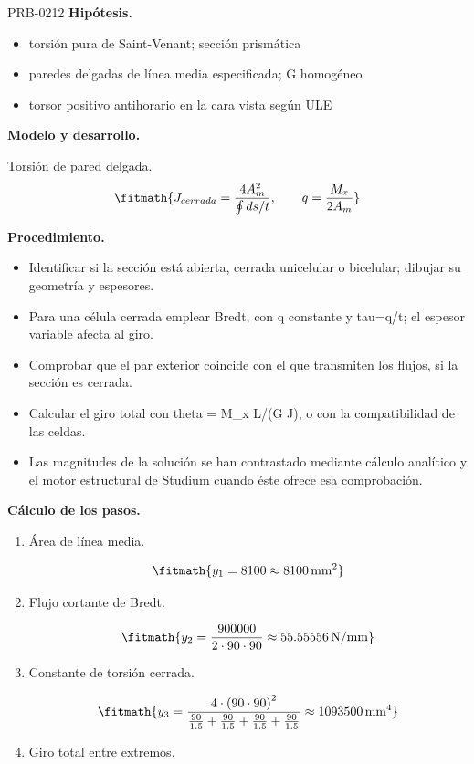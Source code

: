 \begin{studiumworked}{PRB-0212}
\textbf{Hipótesis.}\begin{itemize}\item torsión pura de Saint-Venant; sección prismática
\item paredes delgadas de línea media especificada; G homogéneo
\item torsor positivo antihorario en la cara vista según ULE\end{itemize}

\textbf{Modelo y desarrollo.}

Torsión de pared delgada.\[\fitmath{J_{cerrada}=\frac{4A_m^2}{\oint ds/t},\qquad q=\frac{M_x}{2A_m}}\]

\textbf{Procedimiento.}\begin{itemize}\item Identificar si la sección está abierta, cerrada unicelular o bicelular; dibujar su geometría y espesores.
\item Para una célula cerrada emplear Bredt, con q constante y tau=q/t; el espesor variable afecta al giro.
\item Comprobar que el par exterior coincide con el que transmiten los flujos, si la sección es cerrada.
\item Calcular el giro total con theta = M\_x L/(G J), o con la compatibilidad de las celdas.
\item Las magnitudes de la solución se han contrastado mediante cálculo analítico y el motor estructural de Studium cuando éste ofrece esa comprobación.\end{itemize}

\textbf{Cálculo de los pasos.}

\begin{enumerate}

\item Área de línea media.

\[\fitmath{y_{1}=8100\approx 8100\,\mathrm{mm^{2}}}\]

\item Flujo cortante de Bredt.

\[\fitmath{y_{2}=\frac{900000}{2\cdot 90\cdot 90}\approx 55.55556\,\mathrm{N/mm}}\]

\item Constante de torsión cerrada.

\[\fitmath{y_{3}=\frac{4\cdot {\left(90\cdot 90\right)}^{2}}{\frac{90}{1.5}+\frac{90}{1.5}+\frac{90}{1.5}+\frac{90}{1.5}}\approx 1093500\,\mathrm{mm^{4}}}\]

\item Giro total entre extremos.


\end{enumerate}
\end{studiumworked}
